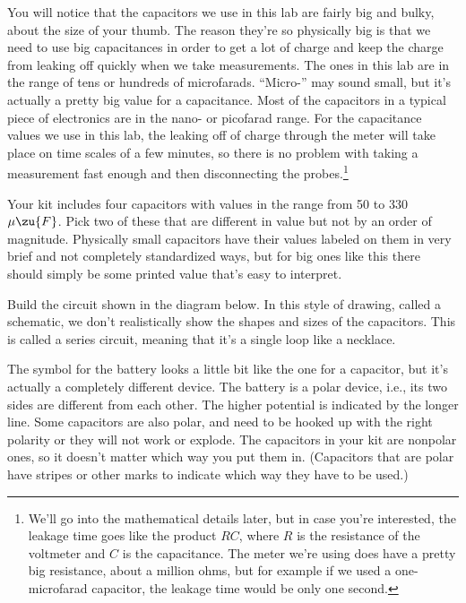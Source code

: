 You will notice that the capacitors we use in this lab are fairly big
and bulky, about the size of your thumb. The reason they're so physically
big is that we need to use big capacitances in order to get a lot of charge and keep the charge
from leaking off quickly when we take measurements. The ones in this lab are in the range of tens or hundreds
of microfarads. ``Micro-'' may sound small, but it's actually a pretty
big value for a capacitance. Most of the capacitors in a typical piece
of electronics are in the nano- or picofarad range. For
the capacitance values we use in this lab, the leaking off of charge through the meter will take place on time scales of a few
minutes, so there is no problem with taking a measurement fast enough
and then disconnecting the probes.\footnote{We'll go into the mathematical
details later, but in case you're interested, the leakage time goes like
the product $RC$, where $R$ is the resistance of the voltmeter and $C$ is
the capacitance. The meter we're using does have a pretty big resistance,
about a million ohms, but for example if we used a one-microfarad
capacitor, the leakage time would be only one second.}

\observations


Your kit includes four capacitors with values in the range from 50 to 330 $\mu\zu{F}$.
Pick two of these that are different in value but not by an order of magnitude.
Physically small capacitors have their values labeled on them in very brief and
not completely standardized ways, but for big ones like this there should simply
be some printed value that's easy to interpret.

Build the circuit shown in the diagram below. In this style of drawing, called
a schematic, we don't realistically show the shapes and sizes of the capacitors.
This is called a series circuit, meaning that it's a single loop like a necklace.


The symbol for the battery looks a little bit like the one for a capacitor, but
it's actually a completely different device.
The battery is a polar device, i.e., its two sides are different from each other.
The higher potential is indicated by the longer line.
Some capacitors are also polar, and need to be hooked up with the right polarity
or they will not work or explode. The capacitors in your kit are nonpolar ones,
so it doesn't matter which way you put them in. (Capacitors that are polar have
stripes or other marks to indicate which way they have to be used.)

